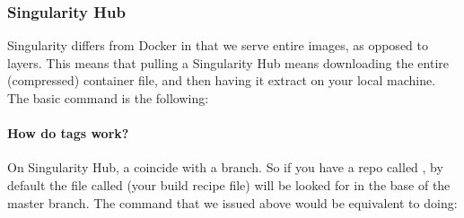\documentclass[letterpaper,10pt,english]{sphinxmanual}
\begin{document}
\subsubsection{Singularity Hub}
\label{\detokenize{appendix:singularity-hub}}
Singularity differs from Docker in that we serve entire images, as
opposed to layers. This means that pulling a Singularity Hub means
downloading the entire (compressed) container file, and then having it
extract on your local machine. The basic command is the following:

%
\begin{sphinxVerbatim}[commandchars=\\\{\}]
  

  

    
\end{sphinxVerbatim}


\paragraph{How do tags work?}
\label{\detokenize{appendix:how-do-tags-work}}
On Singularity Hub, a  coincide with a branch. So if you have a repo
called  , by default the file called  (your build recipe file) will be
looked for in the base of the master branch. The command that we issued
above would be equivalent to doing:

%
\begin{sphinxVerbatim}[commandchars=\\\{\}]
  
\end{sphinxVerbatim}
\end{document}
